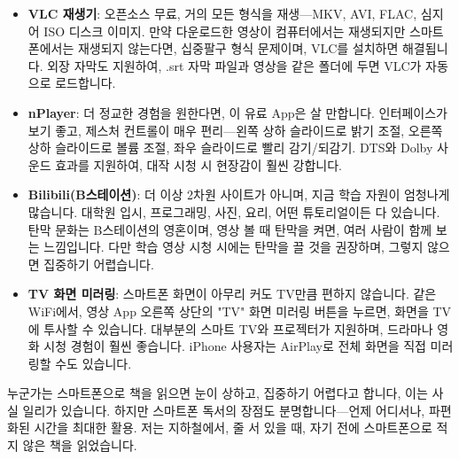 \begin{itemize}
  \item \textbf{VLC 재생기}: 오픈소스 무료, 거의 모든 형식을 재생—MKV, AVI, FLAC, 심지어 ISO 디스크 이미지. 만약 다운로드한 영상이 컴퓨터에서는 재생되지만 스마트폰에서는 재생되지 않는다면, 십중팔구 형식 문제이며, VLC를 설치하면 해결됩니다. 외장 자막도 지원하여, .srt 자막 파일과 영상을 같은 폴더에 두면 VLC가 자동으로 로드합니다.
  \item \textbf{nPlayer}: 더 정교한 경험을 원한다면, 이 유료 App은 살 만합니다. 인터페이스가 보기 좋고, 제스처 컨트롤이 매우 편리—왼쪽 상하 슬라이드로 밝기 조절, 오른쪽 상하 슬라이드로 볼륨 조절, 좌우 슬라이드로 빨리 감기/되감기. DTS와 Dolby 사운드 효과를 지원하여, 대작 시청 시 현장감이 훨씬 강합니다.
  \item \textbf{Bilibili(B스테이션)}: 더 이상 2차원 사이트가 아니며, 지금 학습 자원이 엄청나게 많습니다. 대학원 입시, 프로그래밍, 사진, 요리, 어떤 튜토리얼이든 다 있습니다. 탄막 문화는 B스테이션의 영혼이며, 영상 볼 때 탄막을 켜면, 여러 사람이 함께 보는 느낌입니다. 다만 학습 영상 시청 시에는 탄막을 끌 것을 권장하며, 그렇지 않으면 집중하기 어렵습니다.
  \item \textbf{TV 화면 미러링}: 스마트폰 화면이 아무리 커도 TV만큼 편하지 않습니다. 같은 WiFi에서, 영상 App 오른쪽 상단의 "TV" 화면 미러링 버튼을 누르면, 화면을 TV에 투사할 수 있습니다. 대부분의 스마트 TV와 프로젝터가 지원하며, 드라마나 영화 시청 경험이 훨씬 좋습니다. iPhone 사용자는 AirPlay로 전체 화면을 직접 미러링할 수도 있습니다.
\end{itemize}


누군가는 스마트폰으로 책을 읽으면 눈이 상하고, 집중하기 어렵다고 합니다, 이는 사실 일리가 있습니다. 하지만 스마트폰 독서의 장점도 분명합니다—언제 어디서나, 파편화된 시간을 최대한 활용. 저는 지하철에서, 줄 서 있을 때, 자기 전에 스마트폰으로 적지 않은 책을 읽었습니다.

